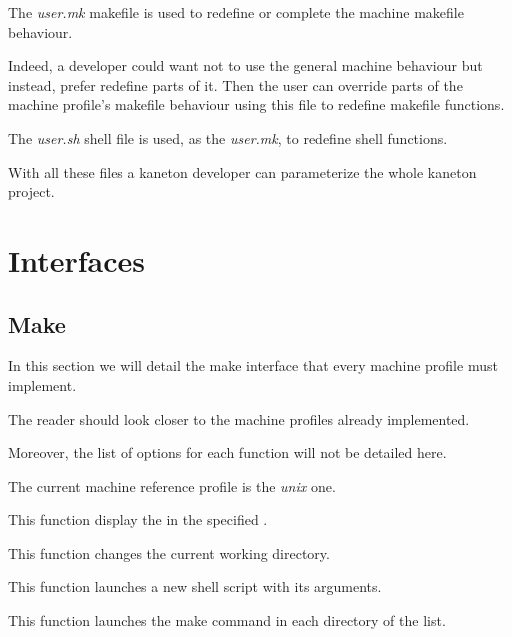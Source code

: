 The \textit{user.mk} makefile is used to redefine or complete the machine
makefile behaviour.

Indeed, a developer could want not to use the general machine behaviour but
instead, prefer redefine parts of it. Then the user can override parts of
the machine profile's makefile behaviour using this file to redefine makefile
functions.

The \textit{user.sh} shell file is used, as the \textit{user.mk}, to
redefine shell functions.

With all these files a kaneton developer can parameterize the whole
kaneton project.

%
%

\section{Interfaces}

%
%

\subsection{Make}

In this section we will detail the make interface that every machine
profile must implement.

The reader should look closer to the machine profiles already implemented.

Moreover, the list of options for each function will not be detailed here.

The current machine reference profile is the \textit{unix} one.

         {
	   This function display the  in the specified
	   .
	 }

         {
	   This function changes the current working directory.
	 }

         {
	   This function launches a new shell script with its arguments.
	 }

         {
	   This function launches the make command in each directory of
	   the list.
	 }

